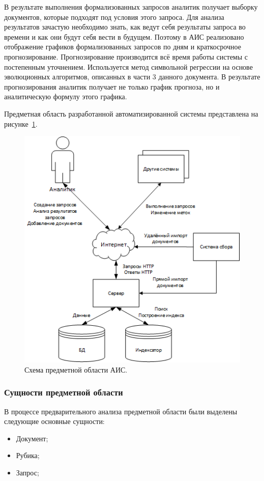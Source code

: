 В результате выполнения формализованных запросов аналитик получает выборку документов, которые подходят под условия этого запроса. Для анализа результатов зачастую необходимо знать, как ведут себя результаты запроса во времени и как они будут себя вести в будущем. Поэтому в АИС реализовано отображение графиков формализованных запросов по дням и краткосрочное прогнозирование. Прогнозирование производится всё время работы системы с постепенным уточнением. Используется метод символьной регрессии на основе эволюционных алгоритмов, описанных в части 3 данного документа. В результате прогнозирования аналитик получает не только график прогноза, но и аналитическую формулу этого графика.

Предметная область разработанной автоматизированной системы представлена на
рисунке~\ref{figure:domain}.

\begin{figure}[!h]
\centering
\includegraphics{design/domain}
\caption{Схема предметной области АИС.}
\label{figure:domain}
\end{figure}

\subsubsection{Сущности предметной области}

В процессе предварительного анализа предметной области были выделены следующие основные сущности:
\begin{itemize}
\item Документ;
\item Рубика;
\item Запрос;
\end{itemize}

